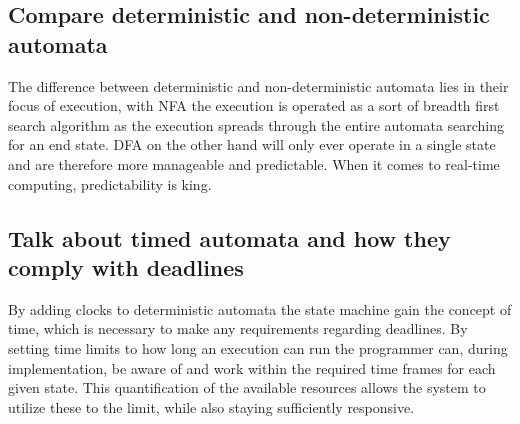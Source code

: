 \subsection{Compare deterministic and non-deterministic automata}
The difference between deterministic and non-deterministic automata lies in their focus of execution, with NFA the execution is operated as a sort of breadth first search algorithm as the execution spreads through the entire automata searching for an end state. DFA on the other hand will only ever operate in a single state and are therefore more manageable and predictable. When it comes to real-time computing, predictability is king.

\subsection{Talk about timed automata and how they comply with deadlines}
By adding clocks to deterministic automata the state machine gain the concept of time, which is necessary to make any requirements regarding deadlines. By setting time limits to how long an execution can run the programmer can, during implementation, be aware of and work within the required time frames for each given state. This quantification of the available resources allows the system to utilize these to the limit, while also staying sufficiently responsive. 